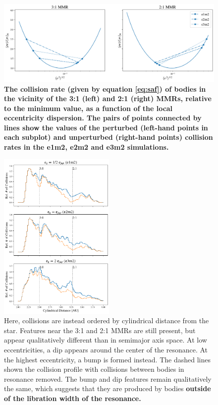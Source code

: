 \documentclass[fleqn,usenatbib]{mnras}
\begin{document}
\begin{figure}
\begin{center}
    \includegraphics[width=\textwidth]{figures/gf_plot.png}
    \caption{\textbf{The collision rate (given by equation \ref{eq:saf}) of bodies in the vicinity of the 3:1 (left) and 2:1 (right) MMRs, relative to the minimum value, as a function of the local eccentricity dispersion. The pairs of points connected by lines show the values of the perturbed (left-hand points in each subplot) and unperturbed (right-hand points) collision rates in the e1m2, e2m2 and e3m2 simulations.}\label{fig:gf}}
\end{center}
\end{figure}

\begin{figure}
\begin{center}
    \includegraphics[width=0.5\textwidth]{figures/coll_hist_r.png}
    \caption{Here, collisions are instead ordered by cylindrical distance from the star. Features near the 3:1 and 2:1 MMRs are still present, but appear qualitatively different than in semimajor axis space. At low eccentricities, a dip appears around the center of the resonance. At the highest eccentricity, a bump is formed instead. The dashed lines shown the collision profile with collisions between bodies in resonance removed. The bump and dip features remain qualitatively the same, which suggests that they are produced by bodies \textbf{outside of the libration width of the resonance.}\label{fig:coll_hist_r}}
\end{center}
\end{figure}
\end{document}

